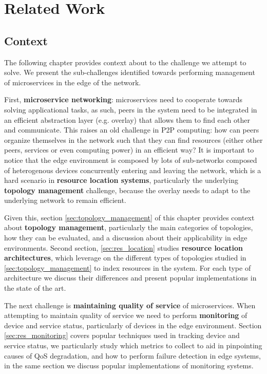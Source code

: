\chapter{Related Work} \label{cha:related_work}

\section{Context}

The following chapter provides context about to the challenge we attempt to solve. We present the sub-challenges identified towards performing management of microservices in the edge of the network. 

First, \textbf{microservice networking}: microservices need to cooperate towards solving applicational tasks, as such, peers in the system need to be integrated in an efficient abstraction layer (e.g. overlay) that allows them to find each other and communicate. This raises an old challenge in P2P computing: how can peers organize themselves in the network such that they can find resources (either other peers, services or even computing power) in an efficient way? It is important to notice that the edge environment is composed by lots of sub-networks composed of heterogenous devices concurrently entering and leaving the network, which is a hard scenario in \textbf{resource location systems}, particularly the underlying \textbf{topology management} challenge, because the overlay needs to adapt to the underlying network to remain efficient. 

Given this, section \ref{sec:topology_management} of this chapter provides context about \textbf{topology management}, particularly the main categories of topologies, how they can be evaluated, and a discussion about their applicability in edge environments. Second section, \ref{sec:res_location} studies \textbf{resource location architectures}, which leverage on the different types of topologies studied in \ref{sec:topology_management} to index resources in the system. For each type of architecture we discuss their differences and present popular implementations in the state of the art.

The next challenge is \textbf{maintaining quality of service} of microservices. When attempting to maintain quality of service we need to perform \textbf{monitoring} of device and service status, particularly of devices in the edge environment. Section \ref{sec:res_monitoring} covers popular techniques used in tracking device and service status, we particularly study which metrics to collect to aid in pinpointing causes of QoS degradation, and how to perform failure detection in edge systems, in the same section we discuss popular implementations of monitoring systems. 

